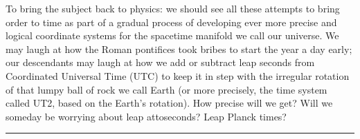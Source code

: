 \documentclass{article}
\begin{document}
To bring the subject back to physics: we should see all these attempts
to bring order to time as part of a gradual process of developing ever
more precise and logical coordinate systems for the spacetime manifold
we call our universe. We may laugh at how the Roman pontifices took
bribes to start the year a day early; our descendants may laugh at how
we add or subtract leap seconds from Coordinated Universal Time (UTC) to
keep it in step with the irregular rotation of that lumpy ball of rock
we call Earth (or more precisely, the time system called UT2, based on
the Earth's rotation). How precise will we get? Will we someday be
worrying about leap attoseconds? Leap Planck times?

\begin{center}\rule{0.5\linewidth}{0.5pt}\end{center}
\end{document}
